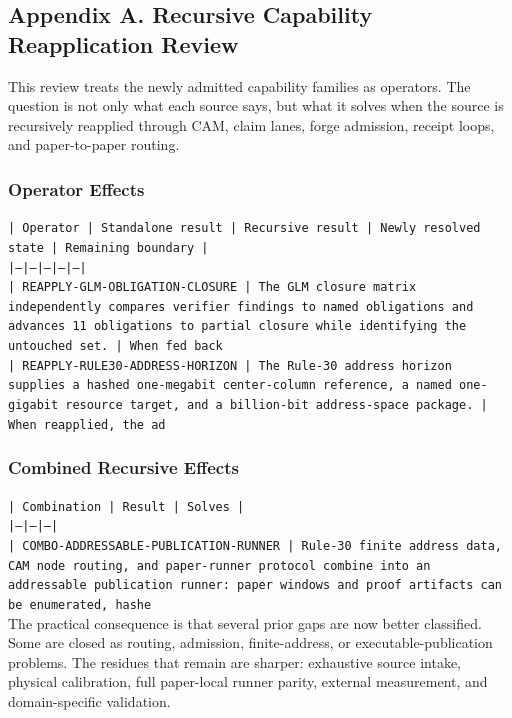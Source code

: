 \documentclass[11pt]{article}
\begin{document}
\subsection*{Appendix A. Recursive Capability Reapplication Review}

This review treats the newly admitted capability families as operators. The question is not only what each source says, but what it solves when the source is recursively reapplied through CAM, claim lanes, forge admission, receipt loops, and paper-to-paper routing.

\subsubsection*{Operator Effects}

\noindent\texttt{| Operator | Standalone result | Recursive result | Newly resolved state | Remaining boundary |}\\
\noindent\texttt{|---|---|---|---|---|}\\
\noindent\texttt{| REAPPLY-GLM-OBLIGATION-CLOSURE | The GLM closure matrix independently compares verifier findings to named obligations and advances 11 obligations to partial closure while identifying the untouched set. | When fed back }\\
\noindent\texttt{| REAPPLY-RULE30-ADDRESS-HORIZON | The Rule-30 address horizon supplies a hashed one-megabit center-column reference, a named one-gigabit resource target, and a billion-bit address-space package. | When reapplied, the ad}\\

\subsubsection*{Combined Recursive Effects}

\noindent\texttt{| Combination | Result | Solves |}\\
\noindent\texttt{|---|---|---|}\\
\noindent\texttt{| COMBO-ADDRESSABLE-PUBLICATION-RUNNER | Rule-30 finite address data, CAM node routing, and paper-runner protocol combine into an addressable publication runner: paper windows and proof artifacts can be enumerated, hashe}\\

The practical consequence is that several prior gaps are now better classified. Some are closed as routing, admission, finite-address, or executable-publication problems. The residues that remain are sharper: exhaustive source intake, physical calibration, full paper-local runner parity, external measurement, and domain-specific validation.
\end{document}
